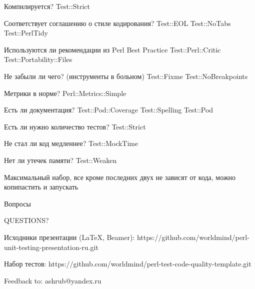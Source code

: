 \documentclass{beamer}
\begin{document}
\begin{frame}{Компилируется?}
Test::Strict
\end{frame}

\begin{frame}{Соответствует соглашению о стиле кодирования?}
Test::EOL
Test::NoTabs
Test::PerlTidy
\end{frame}

\begin{frame}{Используются ли рекомендации из Perl Best Practice}
Test::Perl::Critic
Test::Portability::Files
\end{frame}

\begin{frame}{Не забыли ли чего? (инструменты в больном)}
Test::Fixme
Test::NoBreakpoints
\end{frame}

\begin{frame}{Метрики в норме?}
Perl::Metrics::Simple
\end{frame}

\begin{frame}{Есть ли документация?}
Test::Pod::Coverage
Test::Spelling
Test::Pod
\end{frame}

\begin{frame}{Есть ли нужно количество тестов?}
Test::Strict
\end{frame}

\begin{frame}{Не стал ли код медленнее?}
Test::MockTime
\end{frame}

\begin{frame}{Нет ли утечек памяти?}
Test::Weaken
\end{frame}

\begin{frame}{}
Максимальный набор, все кроме последних двух не зависят от кода, можно копипастить и запускать
\end{frame}
\begin{frame}{Вопросы}

\begin{center}
\LARGE QUESTIONS?
\end{center}

\begin{block}{Исходники презентации (LaTeX, Beamer):}
https://github.com/worldmind/perl-unit-testing-presentation-ru.git
\end{block}

\begin{block}{Набор тестов:}
https://github.com/worldmind/perl-test-code-quality-template.git
\end{block}

\begin{block}{Feedback to:}
ashrub@yandex.ru
\end{block}

\end{frame}
\end{document}
